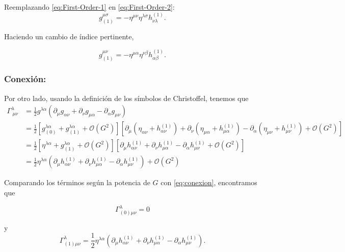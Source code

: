 \documentclass[letterpaper,11pt]{article}
\begin{document}
Reemplazando \eqref{eq:First-Order-1} en \eqref{eq:First-Order-2}:
\begin{equation}
g_{(1)}^{\mu\sigma} = - \eta^{\mu\nu} \eta^{\lambda \sigma}  h_{\nu\lambda}^{(1)}.
\end{equation}

Haciendo un cambio de índice pertinente, 
\begin{shaded}
\begin{equation}
g_{(1)}^{\mu\nu}  = - \eta^{\mu\alpha} \eta^{\nu\beta} h_{\alpha\beta}^{(1)}. \label{eq:First-Order-3}
\end{equation}
\end{shaded}

\subsubsection*{Conexión:}

Por otro lado, usando la definición de los símbolos de Christoffel, tenemos que 
\begin{align}
\Gamma^{\lambda}_{\ \mu\nu} &= \frac{1}{2} g^{\lambda\alpha} \left(\partial_{\mu} g_{\alpha\nu} + \partial_{\nu} g_{\mu\alpha} - \partial_{\alpha} g_{\mu\nu}\right) \nonumber\\
&= \frac{1}{2} \left[ g_{(0)}^{\lambda\alpha} + g_{(1)}^{\lambda\alpha} + \mathcal{O}(G^2) \right] \left[ \partial_{\mu}\left(\eta_{\alpha\nu} + h^{(1)}_{\alpha\nu}\right) + \partial_{\nu}\left(\eta_{\mu\alpha} + h^{(1)}_{\mu\alpha}\right) - \partial_{\alpha} \left(\eta_{\mu\nu} + h^{(1)}_{\mu\nu}\right) + \mathcal{O}(G^2)  \right] \nonumber\\
&=  \frac{1}{2} \left[ \eta^{\lambda\alpha} + g_{(1)}^{\lambda\alpha} + \mathcal{O}(G^2) \right] \left[ \partial_{\mu} h^{(1)}_{\alpha\nu} + \partial_{\nu} h^{(1)}_{\mu\alpha} - \partial_{\alpha} h^{(1)}_{\mu\nu} + \mathcal{O}(G^2)  \right] \nonumber\\
&= \frac{1}{2}  \eta^{\lambda \alpha} \left( \partial_{\mu} h^{(1)}_{\alpha\nu} + \partial_{\nu} h^{(1)}_{\mu\alpha} - \partial_{\alpha} h^{(1)}_{\mu\nu} \right) + \mathcal{O}(G^2)  
\end{align}

Comparando los términos según la potencia de $G$ con \eqref{eq:conexion}, encontramos que
\begin{shaded}
\begin{equation}
\Gamma^{\lambda}_{(0) \mu\nu} = 0 \label{eq:First-Order-4} 
\end{equation}
\end{shaded}
y 
\begin{equation}
\Gamma^{\lambda}_{(1) \mu\nu} = \frac{1}{2}  \eta^{\lambda \alpha} \left( \partial_{\mu} h^{(1)}_{\alpha\nu} + \partial_{\nu} h^{(1)}_{\mu\alpha} - \partial_{\alpha} h^{(1)}_{\mu\nu} \right). \label{eq:First-Order-5}
\end{equation}
\end{document}
